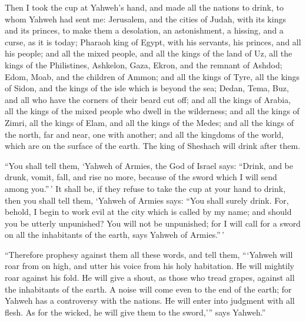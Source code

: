  Then I took the cup at Yahweh's hand, and made all the
nations to drink, to whom Yahweh had sent me:  Jerusalem,
and the cities of Judah, with its kings and its princes, to make them a
desolation, an astonishment, a hissing, and a curse, as it is today;
 Pharaoh king of Egypt, with his servants, his princes, and
all his people;  and all the mixed people, and all the
kings of the land of Uz, all the kings of the Philistines, Ashkelon,
Gaza, Ekron, and the remnant of Ashdod;  Edom, Moab, and
the children of Ammon;  and all the kings of Tyre, all the
kings of Sidon, and the kings of the isle which is beyond the sea;
 Dedan, Tema, Buz, and all who have the corners of their
beard cut off;  and all the kings of Arabia, all the kings
of the mixed people who dwell in the wilderness;  and all
the kings of Zimri, all the kings of Elam, and all the kings of the
Medes;  and all the kings of the north, far and near, one
with another; and all the kingdoms of the world, which are on the
surface of the earth. The king of Sheshach will drink after them.

 ``You shall tell them, `Yahweh of Armies, the God of
Israel says: ``Drink, and be drunk, vomit, fall, and rise no more,
because of the sword which I will send among you.''\,'  It
shall be, if they refuse to take the cup at your hand to drink, then you
shall tell them, `Yahweh of Armies says: ``You shall surely drink.
 For, behold, I begin to work evil at the city which is
called by my name; and should you be utterly unpunished? You will not be
unpunished; for I will call for a sword on all the inhabitants of the
earth, says Yahweh of Armies.''\,'

 ``Therefore prophesy against them all these words, and
tell them, ```Yahweh will roar from on high, and utter his voice from
his holy habitation. He will mightily roar against his fold. He will
give a shout, as those who tread grapes, against all the inhabitants of
the earth.  A noise will come even to the end of the earth;
for Yahweh has a controversy with the nations. He will enter into
judgment with all flesh. As for the wicked, he will give them to the
sword,''' says Yahweh.''


